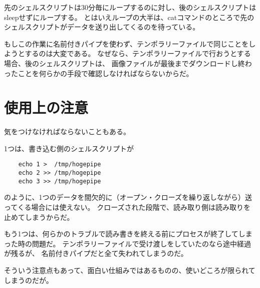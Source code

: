 先のシェルスクリプトは30分毎にループするのに対し、後のシェルスクリプトはsleepせずにループする。
とはいえループの大半は、catコマンドのところで先のシェルスクリプトがデータを送り出してくるのを待っている。

もしこの作業に名前付きパイプを使わず、テンポラリーファイルで同じことをしようとするのは大変である。
なぜなら、テンポラリーファイルで行おうとする場合、後のシェルスクリプトは、
画像ファイルが最後までダウンロードし終わったことを何らかの手段で確認しなければならないからだ。

\section*{使用上の注意}

気をつけなければならないこともある。

1つは、書き込む側のシェルスクリプトが
\begin{verbatim}
	echo 1 >  /tmp/hogepipe
	echo 2 >> /tmp/hogepipe
	echo 3 >> /tmp/hogepipe
\end{verbatim}
\noindent
のように、1つのデータを間欠的に（オープン・クローズを繰り返しながら）送ってくる場合には使えない。
クローズされた段階で、読み取り側は読み取りを止めてしまうからだ。

もう1つは、何らかのトラブルで読み書きを終える前にプロセスが終了してしまった時の問題だ。
テンポラリーファイルで受け渡しをしていたのなら途中経過が残るが、
名前付きパイプだと全て失われてしまうのだ。

そういう注意点もあって、面白い仕組みではあるものの、使いどころが限られてしまうのだが。
